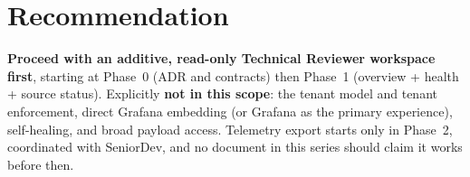 \documentclass[11pt]{article}
\begin{document}
\section{Recommendation}

\textbf{Proceed with an additive, read-only Technical Reviewer workspace
first}, starting at Phase~0 (ADR and contracts) then Phase~1 (overview +
health + source status). Explicitly \textbf{not in this scope}: the tenant
model and tenant enforcement, direct Grafana embedding (or Grafana as the
primary experience), self-healing, and broad payload access. Telemetry export
starts only in Phase~2, coordinated with SeniorDev, and no document in this
series should claim it works before then.
\end{document}
